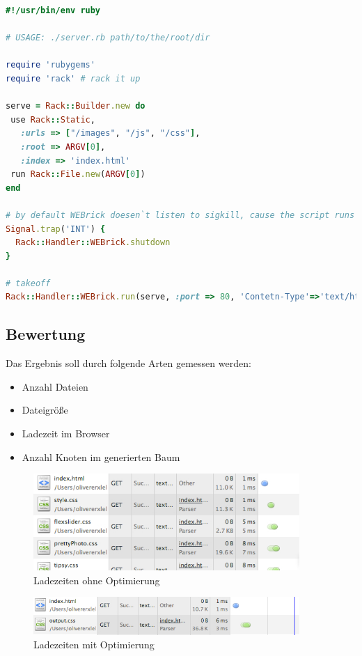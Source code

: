 \begin{lstlisting}[label=server_rb,language=Ruby, caption=Ruby Webservice für Messdaten]
#!/usr/bin/env ruby

# USAGE: ./server.rb path/to/the/root/dir

require 'rubygems'
require 'rack' # rack it up

serve = Rack::Builder.new do
 use Rack::Static, 
   :urls => ["/images", "/js", "/css"],
   :root => ARGV[0],
   :index => 'index.html'
 run Rack::File.new(ARGV[0])
end

# by default WEBrick doesen`t listen to sigkill, cause the script runs in a new session. 
Signal.trap('INT') {
  Rack::Handler::WEBrick.shutdown
}

# takeoff
Rack::Handler::WEBrick.run(serve, :port => 80, 'Contetn-Type'=>'text/html')
\end{lstlisting}

\subsection{Bewertung}
Das Ergebnis soll durch folgende Arten gemessen werden:
\begin{itemize}
    \item{Anzahl Dateien}
    \item{Dateigröße}
    \item{Ladezeit im Browser}
    \item{Anzahl Knoten im generierten Baum}
\end{itemize}

\begin{figure}[ht!]
	\begin{center}
		\includegraphics[width=0.9\textwidth]{img/ladezeiten_chrome_dflt}
		\caption{Ladezeiten ohne Optimierung}
		\label{ladezeiten-dflt}	
	\end{center}
\end{figure}

\begin{figure}[ht!]
	\begin{center}
		\includegraphics[width=0.9\textwidth]{img/ladezeiten_chrome_opted}
		\caption{Ladezeiten mit Optimierung}
		\label{ladezeiten-opted}	
	\end{center}
\end{figure}

